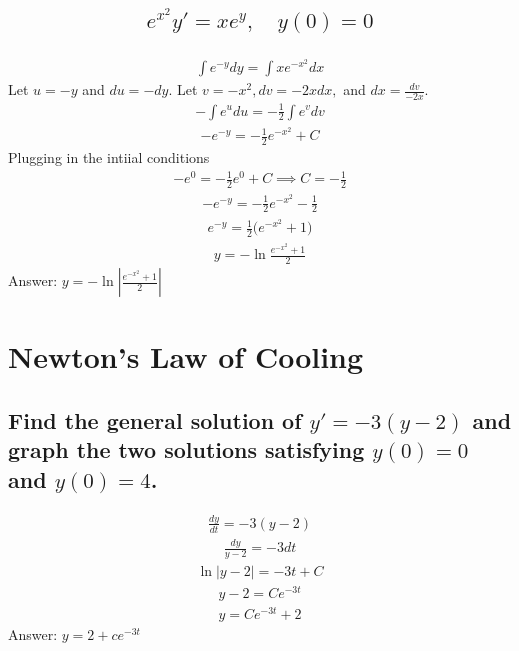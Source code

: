 \documentclass{article}
\begin{document}
\subsection{
	\begin{align*}
		e^{x^2} y' = x e^y, \quad y(0) = 0
	\end{align*}
}
\begin{align*}
	\int{e^{-y}dy} = \int{xe^{-x^2}dx}
\end{align*}
Let $u = -y$ and $du = -dy$. Let $v = -x^2, dv = -2xdx,$ and $dx = \frac{dv}{-2x}$. 
\begin{align*}
	-\int{e^u du} = -\frac{1}{2} \int{e^v dv}
\end{align*}
\begin{align*}
	-e^{-y} = -\frac{1}{2}e^{-x^2} + C
\end{align*}
Plugging in the intiial conditions
\begin{align*}
	-e^0 = -\frac{1}{2}e^0 + C \implies C = -\frac{1}{2}
\end{align*}
\begin{align*}
	-e^{-y} = -\frac{1}{2}e^{-x^2} - \frac{1}{2}
\end{align*}
\begin{align*}
	e^{-y} = \frac{1}{2} \bigg( e^{-x^2} + 1 \bigg)
\end{align*}
\begin{align*}
	y = -\ln{\frac{e^{-x^2} + 1}{2}}
\end{align*}
Answer: $y = - \ln{|\frac{e^{-x^2} + 1}{2}|}$

\section{Newton's Law of Cooling}
\subsection{Find the general solution of $y' = -3(y - 2)$ and graph the two solutions satisfying $y(0) = 0$ and $y(0) = 4$.}
\begin{align*}
	\frac{dy}{dt} = -3(y - 2)
\end{align*}
\begin{align*}
	\frac{dy}{y - 2} = -3dt
\end{align*}
\begin{align*}
	\ln{|y - 2|} = -3t + C
\end{align*}
\begin{align*}
	y - 2 = Ce^{-3t}
\end{align*}
\begin{align*}
	y = Ce^{-3t} + 2
\end{align*}
Answer: $y = 2 + ce^{-3t}$
\end{document}
